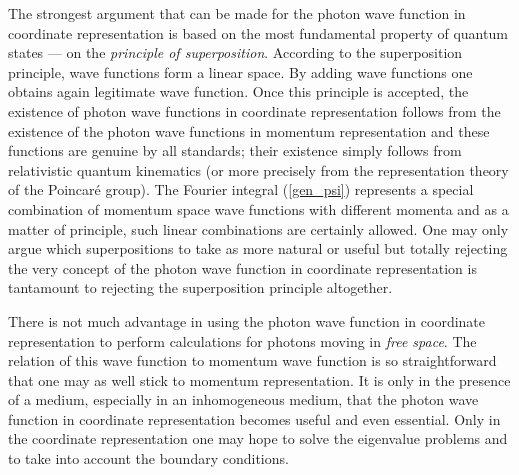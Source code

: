 \documentclass{article}
\begin{document}
The strongest argument that can be made for the photon wave function in
coordinate representation is based on the most fundamental property of
quantum states --- on the {\em principle of superposition}. According to the
superposition principle, wave functions form a linear space. By adding wave
functions one obtains again legitimate wave function. Once this principle is
accepted, the existence of photon wave functions in coordinate
representation follows from the existence of the photon wave functions in
momentum representation and these functions are genuine by all standards;
their existence simply follows from relativistic quantum kinematics (or more
precisely from the representation theory of the Poincar\'e group). The
Fourier integral (\ref{gen_psi}) represents a special combination of
momentum space wave functions with different momenta and as a matter of
principle, such linear combinations are certainly allowed. One may only
argue which superpositions to take as more natural or useful but totally
rejecting the very concept of the photon wave function in coordinate
representation is tantamount to rejecting the superposition principle
altogether.

There is not much advantage in using the photon wave function in coordinate
representation to perform calculations for photons moving in {\em free space}. The relation of this wave function to momentum wave function is so
straightforward that one may as well stick to momentum representation. It is
only in the presence of a medium, especially in an inhomogeneous medium,
that the photon wave function in coordinate representation becomes useful and even essential. Only in the coordinate representation one may hope to solve the eigenvalue problems and to take into account the boundary conditions.
\end{document}
